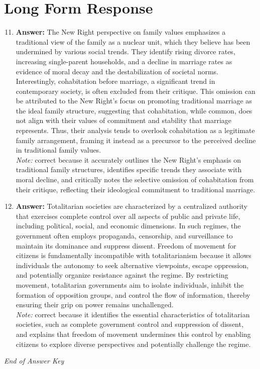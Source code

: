 \documentclass[12pt]{article}
\begin{document}
\section*{Long Form Response}
\begin{enumerate}[label=\arabic*.]
\setcounter{enumi}{10}
\item \textbf{Answer:} The New Right perspective on family values emphasizes a traditional view of the family as a nuclear unit, which they believe has been undermined by various social trends. They identify rising divorce rates, increasing single-parent households, and a decline in marriage rates as evidence of moral decay and the destabilization of societal norms. Interestingly, cohabitation before marriage, a significant trend in contemporary society, is often excluded from their critique. This omission can be attributed to the New Right's focus on promoting traditional marriage as the ideal family structure, suggesting that cohabitation, while common, does not align with their values of commitment and stability that marriage represents. Thus, their analysis tends to overlook cohabitation as a legitimate family arrangement, framing it instead as a precursor to the perceived decline in traditional family values.
\\ \textit{Note:} correct because it accurately outlines the New Right's emphasis on traditional family structures, identifies specific trends they associate with moral decline, and critically notes the selective omission of cohabitation from their critique, reflecting their ideological commitment to traditional marriage.
\item \textbf{Answer:} Totalitarian societies are characterized by a centralized authority that exercises complete control over all aspects of public and private life, including political, social, and economic dimensions. In such regimes, the government often employs propaganda, censorship, and surveillance to maintain its dominance and suppress dissent. Freedom of movement for citizens is fundamentally incompatible with totalitarianism because it allows individuals the autonomy to seek alternative viewpoints, escape oppression, and potentially organize resistance against the regime. By restricting movement, totalitarian governments aim to isolate individuals, inhibit the formation of opposition groups, and control the flow of information, thereby ensuring their grip on power remains unchallenged.
\\ \textit{Note:} correct because it identifies the essential characteristics of totalitarian societies, such as complete government control and suppression of dissent, and explains that freedom of movement undermines this control by enabling citizens to explore diverse perspectives and potentially challenge the regime.
\end{enumerate}

\vfill
\noindent\textit{End of Answer Key}
\end{document}
